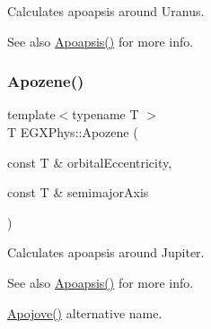 Calculates apoapsis around Uranus. 

\begin{DoxySeeAlso}{See also}
\mbox{\hyperlink{group___apoapsis_gaf962e650bf84a568458e8eb39b1c61ba}{Apoapsis()}} for more info. 
\end{DoxySeeAlso}
\mbox{\label{group___apoapsis_ga44d3dd8d8b350d053b25b7b1f1e15534}} 
\subsubsection{\texorpdfstring{Apozene()}{Apozene()}}
{\footnotesize\ttfamily template$<$typename T $>$ \\
T E\+G\+X\+Phys\+::\+Apozene (\begin{DoxyParamCaption}\item[{const T \&}]{orbital\+Eccentricity,  }\item[{const T \&}]{semimajor\+Axis }\end{DoxyParamCaption})}



Calculates apoapsis around Jupiter. 

\begin{DoxySeeAlso}{See also}
\mbox{\hyperlink{group___apoapsis_gaf962e650bf84a568458e8eb39b1c61ba}{Apoapsis()}} for more info. 

\mbox{\hyperlink{group___apoapsis_ga5a45d0a873514113aaa0adc95aefbbde}{Apojove()}} alternative name. 
\end{DoxySeeAlso}
